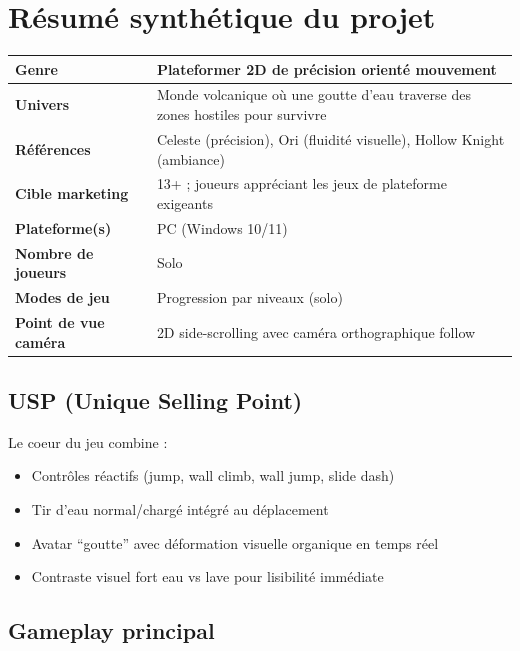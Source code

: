 ﻿\documentclass[12pt,a4paper]{article}
\begin{document}
\section{Résumé synthétique du projet}

\begin{table}[h]
\centering
\begin{tabularx}{\textwidth}{|l|X|}
\hline
\textbf{Genre} & Plateformer 2D de précision orienté mouvement \\ \hline
\textbf{Univers} & Monde volcanique où une goutte d'eau traverse des zones hostiles pour survivre \\ \hline
\textbf{Références} & Celeste (précision), Ori (fluidité visuelle), Hollow Knight (ambiance) \\ \hline
\textbf{Cible marketing} & 13+ ; joueurs appréciant les jeux de plateforme exigeants \\ \hline
\textbf{Plateforme(s)} & PC (Windows 10/11) \\ \hline
\textbf{Nombre de joueurs} & Solo \\ \hline
\textbf{Modes de jeu} & Progression par niveaux (solo) \\ \hline
\textbf{Point de vue caméra} & 2D side-scrolling avec caméra orthographique follow \\ \hline
\end{tabularx}
\end{table}

\subsection{USP (Unique Selling Point)}

\begin{tcolorbox}[colback=waterblue!10,colframe=waterblue!80!black,title=USP]
Le coeur du jeu combine :
\begin{itemize}[noitemsep]
    \item Contrôles réactifs (jump, wall climb, wall jump, slide dash)
    \item Tir d'eau normal/chargé intégré au déplacement
    \item Avatar ``goutte'' avec déformation visuelle organique en temps réel
    \item Contraste visuel fort eau vs lave pour lisibilité immédiate
\end{itemize}
\end{tcolorbox}

\subsection{Gameplay principal}
\end{document}
